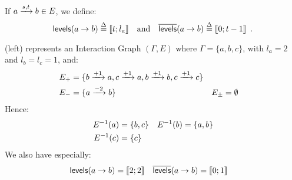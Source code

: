 \begin{definition}\label{def:levels}
If $a \xrightarrow{s, t} b \in E$, we define:
$$\mathsf{levels}(a\rightarrow b) \stackrel{\Delta}= \llbracket t ; l_a \rrbracket \quad \text{and} \quad \overline{\mathsf{levels}}(a\rightarrow b) \stackrel{\Delta}= \llbracket 0 ; t-1 \rrbracket \enspace.$$
\end{definition}

\begin{example}
(left) represents an Interaction Graph $(\Gamma,E)$ where
$\Gamma = \{a, b, c\}$, with $l_a = 2$ and $l_b = l_c = 1$,
and:
\begin{align*}
  E_+ &= \{b \xrightarrow{+ 1} a, c \xrightarrow{+ 1} a,
    b \xrightarrow{+ 1} b, c \xrightarrow{+ 1} c\} \\
  E_- &= \{a \xrightarrow{- 2} b\} &&
    E_\pm = \emptyset \\
\end{align*}
Hence:
\begin{align*}
  E^{-1}(a) &= \{ b, c \} &
  E^{-1}(b) &= \{ a, b \} \\
  E^{-1}(c) &= \{ c \}
\end{align*}
We also have especially:
\begin{align*}
  \mathsf{levels}(a\rightarrow b) &= \llbracket 2 ; 2 \rrbracket & \overline{\mathsf{levels}}(a\rightarrow b) &= \llbracket 0 ; 1 \rrbracket
\end{align*}
\end{example}

